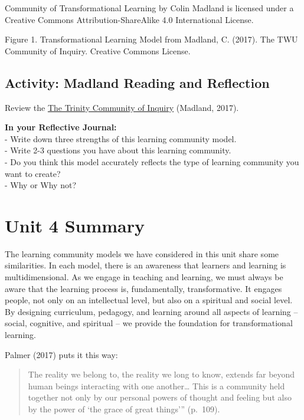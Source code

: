 \documentclass[
]{book}
\begin{document}
{Community of Transformational Learning} by Colin Madland is licensed under a Creative Commons Attribution-ShareAlike 4.0 International License.

Figure 1. Transformational Learning Model from Madland, C. (2017). The TWU Community of Inquiry. Creative Commons
License.

\hypertarget{activity-madland-reading-and-reflection}{%
\subsection*{Activity: Madland Reading and Reflection}\label{activity-madland-reading-and-reflection}}

\begin{reflect}
Review the \href{assets/unit4/Madland-transformational-learning.pdf}{The Trinity Community of Inquiry} (Madland, 2017).

\textbf{In your Reflective Journal:}\\
- Write down three strengths of this learning community model.\\
- Write 2-3 questions you have about this learning community.\\
- Do you think this model accurately reflects the type of learning community you want to create?\\
- Why or Why not?
\end{reflect}

\hypertarget{unit-4-summary}{%
\section*{Unit 4 Summary}\label{unit-4-summary}}

The learning community models we have considered in this unit share some similarities. In each model, there is an awareness that learners and learning is multidimensional. As we engage in teaching and learning, we must always be aware that the learning process is, fundamentally, transformative. It engages people, not only on an intellectual level, but also on a spiritual and social level. By designing curriculum, pedagogy, and learning around all aspects of learning -- social, cognitive, and spiritual -- we provide the foundation for transformational learning.

Palmer (2017) puts it this way:

\begin{quote}
The reality we belong to, the reality we long to know, extends far beyond human beings interacting with one another\ldots{} This is a community held together not only by our personal powers of thought and feeling but also by the power of `the grace of great things''' (p.~109).
\end{quote}
\end{document}
